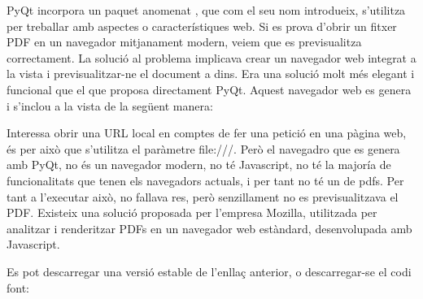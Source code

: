 \documentclass[letterpaper,11pt,catalan]{sphinxmanual}
\begin{document}
PyQt incorpora un paquet anomenat , que com el seu nom introdueix,
s'utilitza per treballar amb aspectes o característiques web. Si es prova d'obrir un
fitxer PDF en un navegador mitjanament modern, veiem que es previsualitza correctament. La solució
al problema implicava crear un navegador web integrat a la vista i previsualitzar-ne el
document a dins. Era una solució molt més elegant i funcional que el que proposa directament
PyQt. Aquest navegador web es genera i s'inclou a la vista de la següent manera:

\begin{sphinxVerbatim}[commandchars=\\\{\}]
  

  
 
  

\end{sphinxVerbatim}

Interessa obrir una URL local en comptes de fer una petició en una pàgina web, és per això que
s'utilitza el paràmetre file:///. Però el navegadro que es genera amb PyQt, no és un navegador
modern, no té Javascript, no té la majoría de funcionalitats que tenen els navegadors actuals,
i per tant no té un  de pdfs. Per tant a l'executar això, no fallava res, però
senzillament no es previsualitzava el PDF. Existeix una solució proposada per l'empresa Mozilla,
utilitzada per analitzar i renderitzar PDFs en un navegador web estàndard, desenvolupada amb Javascript.

Es pot descarregar una versió estable de l'enllaç anterior, o descarregar-se el codi font:

\begin{sphinxVerbatim}[commandchars=\\\{\}]
  
 
\end{sphinxVerbatim}
\end{document}
